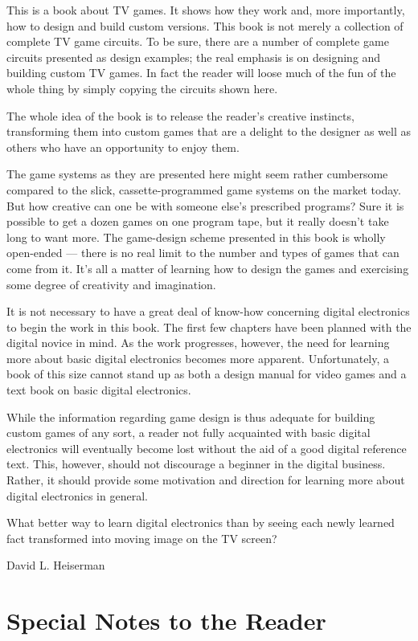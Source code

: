 \documentclass[11pt]{book}              %
\begin{document}
This is a book about TV games. It shows how they work and, more importantly, how to design and build custom versions. This book is not merely a collection of complete TV game circuits. To be sure, there are a number of complete game circuits presented as design examples; the real emphasis is on designing and building custom TV games. In fact the reader will loose much of the fun of the whole thing by simply copying the circuits shown here.

The whole idea of the book is to release the reader’s creative instincts, transforming them into custom games that are a delight to the designer as well as others who have an opportunity to enjoy them.

The game systems as they are presented here might seem rather cumbersome compared to the slick, cassette-programmed game systems on the market today. But how creative can one be with someone else’s prescribed programs? Sure it is possible to get a dozen games on one program tape, but it really doesn’t take long to want more. The game-design scheme presented in this book is wholly open-ended — there is no real limit to the number and types of games that can come from it. It’s all a matter of learning how to design the games and exercising some degree of creativity and imagination.

It is not necessary to have a great deal of know-how concerning digital electronics to begin the work in this book. The first few chapters have been planned with the digital novice in mind. As the work progresses, however, the need for learning more about basic digital electronics becomes more apparent. Unfortunately, a book of this size cannot stand up as both a design manual for video games and a text book on basic digital electronics.

While the information regarding game design is thus adequate for building custom games of any sort, a reader not fully acquainted with basic digital electronics will eventually become lost without the aid of a good digital reference text. This, however, should not discourage a beginner in the digital business. Rather, it should provide some motivation and direction for learning more about digital electronics in general.

What better way to learn digital electronics than by seeing each newly learned fact transformed into moving image on the TV screen?

David L. Heiserman
\newpage
 
\section{Special Notes to the Reader}
\end{document}
